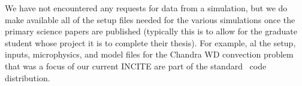 \documentclass[11pt,letterpaper,english]{article}
\begin{document}

We have not encountered any requests for data from a simulation, but we
do make available all of the setup files needed for the various simulations
once the primary science papers are published (typically this is to allow
for the graduate student whose project it is to complete their thesis).
For example, al the setup, inputs, microphysics, and model files for the Chandra
WD convection problem that was a focus of our current INCITE are part of the
standard \maestro\ code distribution.














\end{document}
